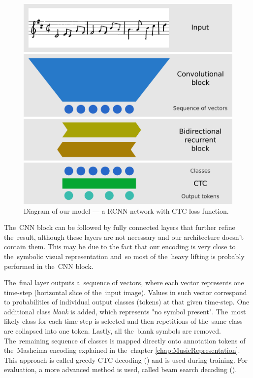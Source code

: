 \begin{figure}[h]
    \centering
    \includegraphics[width=140mm]{../img/network-architecture}
    \caption{Diagram of our model --- a RCNN network with CTC loss function.}
    \label{fig3:NetworkArchitecture}
\end{figure}

The~CNN block can be followed by fully connected layers that further refine the~result, although these layers are not necessary and our architecture doesn't contain them. This may be due to the fact that our encoding is very close to the~symbolic visual representation and~so most of the~heavy lifting is probably performed in the~CNN block.

The~final layer outputs a~sequence of vectors, where each vector represents one time-step (horizontal slice of the~input image). Values in such vector correspond to probabilities of individual output classes (tokens) at that given time-step. One additional class \emph{blank} is added, which represents "no symbol present". The~most likely class for each time-step is selected and then repetitions of the~same class are collapsed into one token. Lastly, all the~blank symbols are removed. The~remaining sequence of classes is mapped directly onto annotation tokens of the~Mashcima encoding explained in the~chapter \ref{chap:MusicRepresentation}. This approach is called greedy CTC decoding (\cite{CTC}) and is used during training. For evaluation, a more advanced method is used, called beam search decoding (\cite{CtcBeamSearch}).

